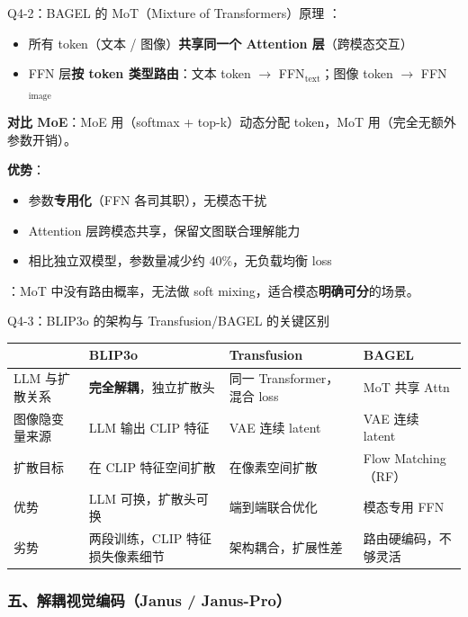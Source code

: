 \begin{conceptbox}{Q4-2：BAGEL 的 MoT（Mixture of Transformers）原理}
：
\begin{itemize}
  \item 所有 token（文本 / 图像）\textbf{共享同一个 Attention 层}（跨模态交互）
  \item FFN 层\textbf{按 token 类型路由}：文本 token $\to$ FFN$_{\text{text}}$；图像 token $\to$ FFN$_{\text{image}}$
\end{itemize}

\textbf{对比 MoE}：MoE 用（softmax + top-k）动态分配 token，MoT 用（完全无额外参数开销）。

\textbf{优势}：
\begin{itemize}
  \item 参数\textbf{专用化}（FFN 各司其职），无模态干扰
  \item Attention 层跨模态共享，保留文图联合理解能力
  \item 相比独立双模型，参数量减少约 40\%，无负载均衡 loss
\end{itemize}

：MoT 中没有路由概率，无法做 soft mixing，适合模态\textbf{明确可分}的场景。
\end{conceptbox}

\begin{conceptbox}{Q4-3：BLIP3o 的架构与 Transfusion/BAGEL 的关键区别}
\begin{center}
\small
\begin{tabular}{|l|l|l|l|}
\hline
& \textbf{BLIP3o} & \textbf{Transfusion} & \textbf{BAGEL} \\
\hline
LLM 与扩散关系 & \textbf{完全解耦}，独立扩散头 & 同一 Transformer，混合 loss & MoT 共享 Attn \\
图像隐变量来源 & LLM 输出 CLIP 特征 & VAE 连续 latent & VAE 连续 latent \\
扩散目标 & 在 CLIP 特征空间扩散 & 在像素空间扩散 & Flow Matching（RF）\\
优势 & LLM 可换，扩散头可换 & 端到端联合优化 & 模态专用 FFN \\
劣势 & 两段训练，CLIP 特征损失像素细节 & 架构耦合，扩展性差 & 路由硬编码，不够灵活 \\
\hline
\end{tabular}
\end{center}
\end{conceptbox}

\subsubsection{五、解耦视觉编码（Janus / Janus-Pro）}

